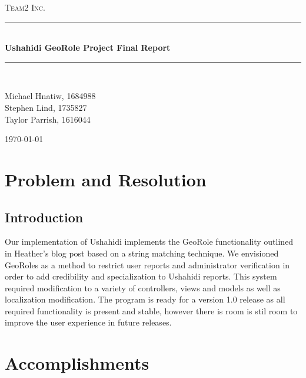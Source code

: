 \documentclass{article}
\newcommand{\HRule}{\rule{\linewidth}{0.5mm}}
\begin{document}
\begin{titlepage}
\begin{center}
\textsc{\LARGE Team2 Inc.}\\[1.5cm]

\HRule \\[1.4cm]
{ \huge \bfseries Ushahidi GeoRole Project Final Report}\\[0.4cm]

\HRule \\[1.5cm]

\begin{minipage}{0.4\textwidth}
\begin{center}
\large Michael Hnatiw, 1684988\\
\large Stephen Lind, 1735827\\
\large Taylor Parrish, 1616044\\
\end{center}
\end{minipage}

\vfill
{\large \today}
\end{center}
\end{titlepage}

\section{Problem and Resolution}
\subsection{Introduction}
Our implementation of Ushahidi implements the GeoRole functionality outlined in Heather's blog post based on a string matching technique. We envisioned GeoRoles as a method to restrict user reports and administrator verification in order to add credibility and specialization to Ushahidi reports. This system required modification to a variety of controllers, views and models as well as localization modification. The program is ready for a version 1.0 release as all required functionality is present and stable, however there is room is stil room to improve the user experience in future releases.

\section{Accomplishments}
\end{document}
